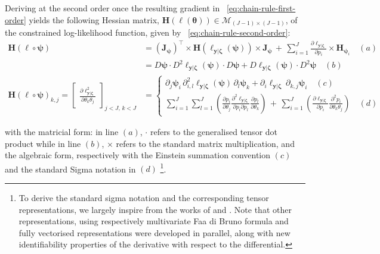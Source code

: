 \documentclass[long, final]{jobim}
\begin{document}
Deriving at the second order once the resulting gradient in \equationname~\ref{eq:chain-rule-first-order} yields the following Hessian matrix, $\mathbf{H}(\ell (\boldsymbol{\theta})) \in \mathcal{M}_{(J-1)\times(J-1)}$, of the constrained log-likelihood function, given by \equationname~\ref{eq:chain-rule-second-order}:
\begin{equation}
     \label{eq:chain-rule-second-order}
\begin{aligned}
    \mathbf{H} (\ell \circ \boldsymbol{\psi}) &= \left(\mathbf{J}_{\boldsymbol{\psi}}\right)^\top \times \mathbf{H} (\ell_{\boldsymbol{y}|\boldsymbol{\zeta}} (\boldsymbol{\psi})) \times \mathbf{J}_{\boldsymbol{\psi}} \, + \, \sum_{i=1}^J \frac{\partial \ell_{\boldsymbol{y}|\boldsymbol{\zeta}}}{\partial p_i} \times     \mathbf{H}_ {\boldsymbol{\psi}_i} \quad (a)\\
 &=   D \boldsymbol{\psi} \cdot  D^2 \ell_{\boldsymbol{y}|\boldsymbol{\zeta}} (\boldsymbol{\psi})  \cdot D\boldsymbol{\psi} + D \ell_{\boldsymbol{y}|\boldsymbol{\zeta}} (\boldsymbol{\psi}) \cdot D^2 \boldsymbol{\psi} \quad (b) \\
\mathbf{H} (\ell \circ \boldsymbol{\psi})_{k, j} =
 \begin{bmatrix}
   \frac{\partial \ell_{\boldsymbol{y}|\boldsymbol{\zeta}}^2 }{\partial \theta_k \theta_j}
  \end{bmatrix}_{j < J, \, k < J}  & =
  \begin{cases}
 \partial_j \boldsymbol{\psi}_i \, \partial^2_{i, l} \ell_{\boldsymbol{y}|\boldsymbol{\zeta}} (\boldsymbol{\psi}) \, \partial_l \boldsymbol{\psi}_k + \partial_i \ell_{\boldsymbol{y}|\boldsymbol{\zeta}} \, \partial_{k,j} \boldsymbol{\psi}_i \quad (c) \\
  \sum_{i=1}^J \sum_{l=1}^J \left(  \frac{\partial p_i }{\partial \theta_j} \frac{\partial^2 \ell_{\boldsymbol{y}|\boldsymbol{\zeta}} }{\partial p_i \partial p_l} \frac{\partial p_l }{\partial \theta_k}\right)  \, + \,  \sum_{i=1}^J  \left( \frac{\partial \ell_{\boldsymbol{y}|\boldsymbol{\zeta}} }{\partial p_i} \frac{\partial^2 p_i }{\partial \theta_k \theta_j}\right) \quad (d)
  \end{cases}
  \end{aligned}
\end{equation}

with the matricial form: in line $(a)$, $\cdot$ refers to the generalised tensor dot product while in line $(b)$, $\times$ refers to the standard matrix multiplication, and the algebraic form, respectively with the Einstein summation convention $(c)$ and the standard Sigma notation in $(d)$ \footnote{To derive the standard sigma notation and the corresponding tensor representations, we largely inspire from the works of \cite{hardy06} and \cite{skorski19}. Note that other representations, using respectively multivariate Faa di Bruno formula \citep{constantine_savits96} and fully vectorised representations \citep{chacon_duong20} were developed in parallel, along with new identifiability properties of the derivative with respect to the differential.}.
\end{document}
